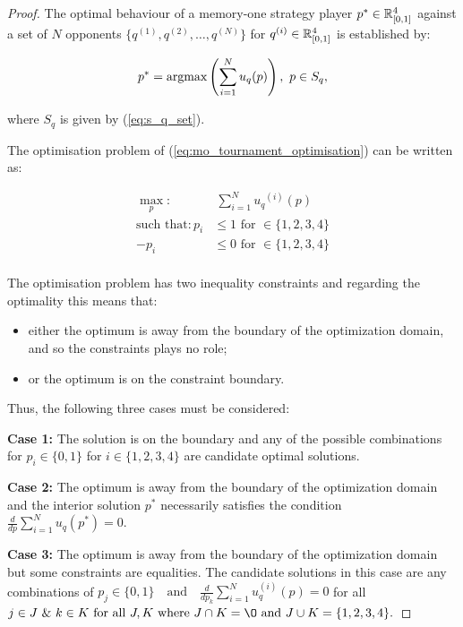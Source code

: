 \begin{proof}
The optimal behaviour of a memory-one strategy player
\(p^* \in \mathbb{R}_{[0, 1]} ^ 4\)
against a set of \(N\) opponents \(\{q^{(1)}, q^{(2)}, \dots, q^{(N)} \}\)
for \(q^{(i)} \in \mathbb{R}_{[0, 1]} ^ 4\) is established by:

\[p^* = \textnormal{argmax}\left(\sum\limits_{i=1} ^ N  u_q(p)\right), \ p \in S_q,\]

where \(S_q\) is given by (\ref{eq:s_q_set}).

The optimisation problem of (\ref{eq:mo_tournament_optimisation}) can be
written as:

\begin{equation}\label{eq:mo_tournament_optimisation_standard}
    \begin{aligned}
    \max_p: & \ \sum_{i=1} ^ {N} {u_q}^{(i)} (p)
    \\
    \text{such that}: p_i & \leq 1 \text{ for } \in \{1, 2, 3, 4\} \\
    - p_i & \leq 0 \text{ for } \in \{1, 2, 3, 4\} \\
    \end{aligned}
\end{equation}

The optimisation problem has two inequality constraints and regarding the optimality
this means that:

\begin{itemize}
    \item either the optimum is away from the boundary of the optimization domain, and so the constraints plays no role;
    \item or the optimum is on the constraint boundary.
\end{itemize}

Thus, the following three cases must be considered:

\textbf{Case 1:} The solution is on the boundary and any of the possible
combinations for $p_i \in \{0, 1\}$ for $i \in \{1, 2, 3, 4\}$ are candidate
optimal solutions.

\textbf{Case 2:} The optimum is away from the boundary of the optimization domain
and the interior solution $p^*$ necessarily satisfies the condition
\(\frac{d}{dp} \sum\limits_{i=1} ^ N  u_q(p^*) = 0\).

\textbf{Case 3:} The optimum is away from the boundary of the optimization domain
but some constraints are equalities. The candidate solutions in this case
are any combinations of $p_j \in \{0, 1\} \quad \text{and} \quad \frac{d}{dp_k} 
\sum\limits_{i=1} ^ N  u_q^{(i)}(p) = 0$ 
for all $ j \in J \text{ \& } k \in K \text{ for all } J, K
\text{ where } J \cap K = \O \text{ and } J \cup K = \{1, 2, 3, 4\}.$


\end{proof}
